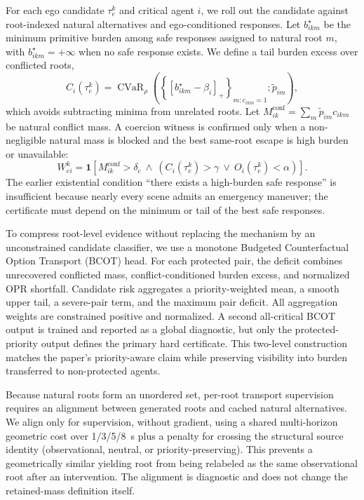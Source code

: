 \documentclass[10pt]{article}
\begin{document}
For each ego candidate $\tau^k_e$ and critical agent $i$, we roll out the candidate against root-indexed natural alternatives and ego-conditioned responses. Let $b^{\star}_{ikm}$ be the minimum primitive burden among safe responses assigned to natural root $m$, with $b^{\star}_{ikm}=+\infty$ when no safe response exists. We define a tail burden excess over conflicted roots,
\begin{equation}
    C_i(\tau^k_e)
    =\operatorname{CVaR}_{\rho}
    \left(
      \left\{[b^{\star}_{ikm}-\beta_i]_+\right\}_{m:c_{ikm}=1};
      \widetilde p_{im}
    \right),
\end{equation}
which avoids subtracting minima from unrelated roots. Let $M^{\mathrm{conf}}_{ik}=\sum_m\widetilde p_{im}c_{ikm}$ be natural conflict mass. A coercion witness is confirmed only when a non-negligible natural mass is blocked and the best same-root escape is high burden or unavailable:
\begin{equation}
    W^k_{ei}=\mathbf{1}
    \left[
      M^{\mathrm{conf}}_{ik}>\delta_c
      \ \wedge\
      \left(C_i(\tau^k_e)>\gamma\ \vee\ O_i(\tau^k_e)<\alpha\right)
    \right].
    \label{eq:witness}
\end{equation}
The earlier existential condition ``there exists a high-burden safe response'' is insufficient because nearly every scene admits an emergency maneuver; the certificate must depend on the minimum or tail of the best safe responses.

To compress root-level evidence without replacing the mechanism by an unconstrained candidate classifier, we use a monotone Budgeted Counterfactual Option Transport (BCOT) head. For each protected pair, the deficit combines unrecovered conflicted mass, conflict-conditioned burden excess, and normalized OPR shortfall. Candidate risk aggregates a priority-weighted mean, a smooth upper tail, a severe-pair term, and the maximum pair deficit. All aggregation weights are constrained positive and normalized. A second all-critical BCOT output is trained and reported as a global diagnostic, but only the protected-priority output defines the primary hard certificate. This two-level construction matches the paper's priority-aware claim while preserving visibility into burden transferred to non-protected agents.

Because natural roots form an unordered set, per-root transport supervision requires an alignment between generated roots and cached natural alternatives. We align only for supervision, without gradient, using a shared multi-horizon geometric cost over 1/3/5/8~s plus a penalty for crossing the structural source identity (observational, neutral, or priority-preserving). This prevents a geometrically similar yielding root from being relabeled as the same observational root after an intervention. The alignment is diagnostic and does not change the retained-mass definition itself.
\end{document}
